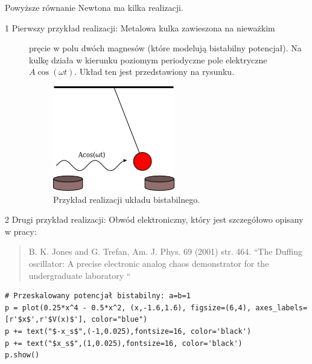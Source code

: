 \documentclass[a4paper,12pt,polish]{sphinxmanual}
\begin{document}
Powyższe równanie Newtona  ma kilka realizacji.
\begin{description}
\item[{1 Pierwszy przykład realizacji: Metalowa kulka zawieszona na nieważkim}] \leavevmode
pręcie w polu dwóch magnesów (które modelują bistabilny potencjał).
Na kulkę działa w kierunku poziomym periodyczne pole elektryczne
$A\cos(\omega t)$. Układ ten jest przedstawiony na rysunku.
\begin{figure}[htbp]
\centering
\capstart

\includegraphics{pendulum.png}
\caption{Przykład realizacji układu bistabilnego.}\end{figure}

\end{description}

2 Drugi przykład realizacji: Obwód elektroniczny, który jest szczegółowo opisany w pracy:
\begin{quote}

B. K. Jones and G. Trefan, Am. J. Phys. 69 (2001) str. 464.
``The Duffing oscillator: A precise electronic analog chaos demonstrator
for the undergraduate laboratory ``
\end{quote}


\begin{verbatim}
# Przeskalowany potencjał bistabilny: a=b=1
p = plot(0.25*x^4 - 0.5*x^2, (x,-1.6,1.6), figsize=(6,4), axes_labels=[r'$x$',r'$V(x)$'], color="blue")
p += text("$-x_s$",(-1,0.025),fontsize=16, color='black')
p += text("$x_s$",(1,0.025),fontsize=16, color='black')
p.show()
\end{verbatim}
\end{document}
